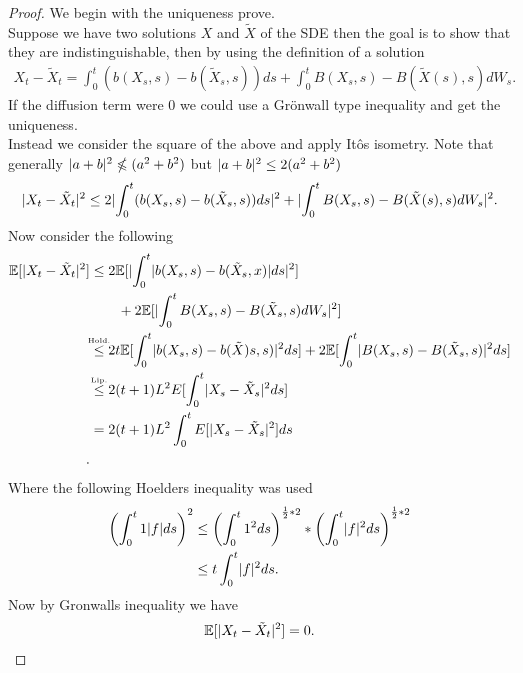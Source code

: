 \begin{proof}
  We begin with the uniqueness prove.\\[1ex] 
  Suppose we have two solutions $X$ and $\tilde{X} $ of the SDE then the goal is to show that they are indistinguishable,
  then by using the definition of a solution 
  \begin{align*}
    X_t - \tilde{X}_t = \int_0^{t} (b(X_s,s) - b(\tilde{X}_s,s )) ds + \int_0^{t} B(X_s,s) - B(\tilde{X}(s),s )  dW_s
  .\end{align*}
  If the diffusion term were 0 we could use a Grönwall type inequality and get the uniqueness.\\[1ex]
  Instead we consider the square of the above and apply It\^os isometry. Note that
  generally $\lvert a+b\rvert^2 \nleqslant  (a^2+b^2)$  but  $\lvert a+b\rvert^2 \le  2(a^2+b^2)$
  \begin{align*}
    \lvert X_t - \tilde{X}_t\rvert^2 \le  2\lvert\int_0^{t} (b(X_s,s) - b(\tilde{X}_s,s )) ds\rvert^2 + \lvert\int_0^{t} B(X_s,s) - B(\tilde{X}(s),s )  dW_s\rvert^2
  .\end{align*}
  Now consider the following 
  \begin{align*}
    \E[\abs{X_t-\tilde{X}_t}^2] &\le 2\E[\abs{\int_0^{t} \abs{b(X_s,s) - b(\tilde{X}_s,x )} ds}^2 ]  \\
                                & \qquad + 2 \E[\abs{\int_0^{t} B(X_s,s) - B(\tilde{X}_s,s ) dW_s}^2]\\
                                &\myS{Hold.}{\le } 2t \E[\int_0^{t} \abs{b(X_s,s) - b(\tilde{X})s,s )}^2 ds ] + 2\E[\int_0^{t} \abs{B(X_s,s)-B(\tilde{X}_s,s )}^2 ds ] \\
                                &\myS{Lip.}{\le } 2(t+1)L^2 E[\int_0^{t} \abs{X_s-\tilde{X}_s }^2 ds ]\\
                                &= 2(t+1)L^2 \int_0^{t} E[\abs{X_s-\tilde{X}_s }^2  ]ds\\
  .\end{align*}
 Where the following Hoelders inequality was used 
 \begin{align*}
   \left( \int_0^{t} 1 \lvert f\rvert ds  \right)^2 &\le  \left( \int_0^{t} 1^2 ds  \right)^{\frac{1}{2}*2}*\left( \int_0^{t} \lvert f\rvert^2 ds  \right)^{\frac{1}{2}*2}  \\
                                             &\le t \int_0^{t} \lvert f\rvert^2 ds 
 .\end{align*}
 Now by Gronwalls inequality we have 
 \begin{align*}
   \mathbb{E}[\lvert X_t-\tilde{X}_t \rvert^2] = 0
 .\end{align*}

\end{proof}
